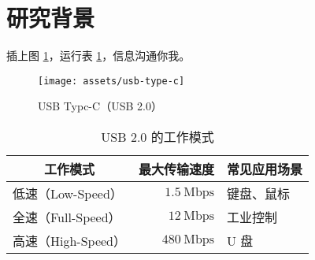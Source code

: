 \section{研究背景}

插上图 \ref{fig:usb-type-c}，运行表 \ref{table:usb-2}，信息沟通你我\cite{information}。

\begin{figure}[tb]
	\centering
	\texttt{[image: assets/usb-type-c]}
	\caption{USB Typc-C（USB 2.0）}
	\label{fig:usb-type-c}
\end{figure}

\begin{table}[htb]
	\centering
	\caption{USB 2.0 的工作模式}
	\label{table:usb-2}
	\begin{tabular}{lrl}
		\toprule
		\multicolumn{1}{c}{\textbf{工作模式}} & \multicolumn{1}{c}{\textbf{最大传输速度}} & \multicolumn{1}{c}{\textbf{常见应用场景}} \\
		\midrule
		低速（Low-Speed）  & $1.5~\mathrm{Mbps}$ & 键盘、鼠标 \\
		全速（Full-Speed） & $12~\mathrm{Mbps}$  & 工业控制 \\
		高速（High-Speed） & $480~\mathrm{Mbps}$ & U 盘 \\
		\bottomrule
	\end{tabular}
\end{table}





